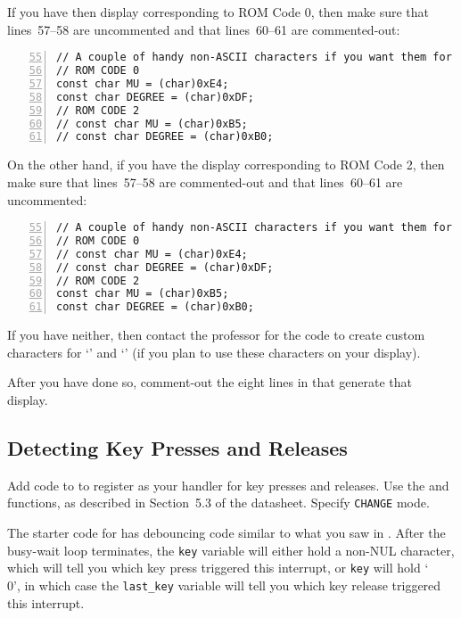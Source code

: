 If you have then display corresponding to ROM Code 0, then make sure that lines~57--58 are uncommented and that lines~60--61 are commented-out:
\begin{lstlisting}[numberstyle=\color{gray}, numbers=left, firstnumber=55]
// A couple of handy non-ASCII characters if you want them for your display
// ROM CODE 0
const char MU = (char)0xE4;
const char DEGREE = (char)0xDF;
// ROM CODE 2
// const char MU = (char)0xB5;
// const char DEGREE = (char)0xB0;
\end{lstlisting}
On the other hand, if you have the display corresponding to ROM Code 2, then make sure that lines~57--58 are commented-out and that lines~60--61 are uncommented:
\begin{lstlisting}[numberstyle=\color{gray}, numbers=left, firstnumber=55]
// A couple of handy non-ASCII characters if you want them for your display
// ROM CODE 0
// const char MU = (char)0xE4;
// const char DEGREE = (char)0xDF;
// ROM CODE 2
const char MU = (char)0xB5;
const char DEGREE = (char)0xB0;
\end{lstlisting}
If you have neither, then contact the professor for the code to create custom characters for `\textmu' and `\textdegree' (if you plan to use these characters on your display).

After you have done so, comment-out the eight lines in  that generate that display.


\subsection{Detecting Key Presses and Releases}

Add code to  to register  as your handler for key presses and releases.
Use the  and  functions, as described in Section~5.3 of the datasheet.
Specify \lstinline{CHANGE} mode.

The starter code for  has debouncing code similar to what you saw in .
After the busy-wait loop terminates, the \lstinline{key} variable will either hold a non-NUL character, which will tell you which key press triggered this interrupt,
or \lstinline{key} will hold `\\0', in which case the \lstinline{last_key} variable will tell you which key release triggered this interrupt.

